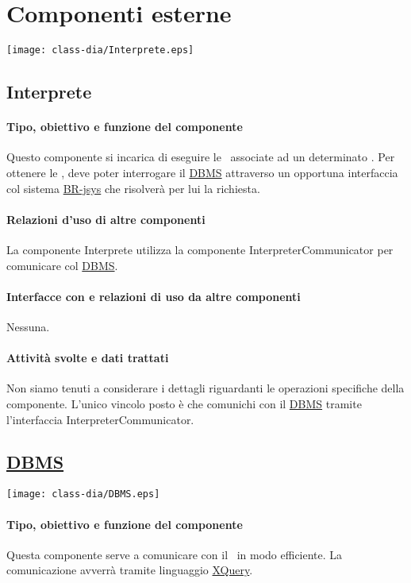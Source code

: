 \chapter{Componenti esterne}
\begin{center}
 \texttt{[image: class-dia/Interprete.eps]}
\end{center}
\section{Interprete}
\subsubsection{Tipo, obiettivo e funzione del componente}
Questo componente si incarica di eseguire le \brs\ associate ad un determinato \bo. Per ottenere le \br, deve poter interrogare il \underline{DBMS} attraverso un opportuna interfaccia col sistema \underline{BR-jsys} che risolver\`a per lui la richiesta.
\subsubsection{Relazioni d'uso di altre componenti}
La componente Interprete utilizza la componente InterpreterCommunicator per comunicare col \underline{DBMS}.
\subsubsection{Interfacce con e relazioni di uso da altre componenti}
Nessuna.
\subsubsection{Attivit\`a svolte e dati trattati}
Non siamo tenuti a considerare i dettagli riguardanti le operazioni specifiche della componente. L'unico vincolo posto \`e che comunichi con il \underline{DBMS} tramite l'interfaccia InterpreterCommunicator.
\section{\underline{DBMS}}
\begin{center}
 \texttt{[image: class-dia/DBMS.eps]}
\end{center}
\subsubsection{Tipo, obiettivo e funzione del componente}
Questa componente serve a comunicare con il \rp\ in modo efficiente. La comunicazione avverr\`a tramite linguaggio \underline{XQuery}.
